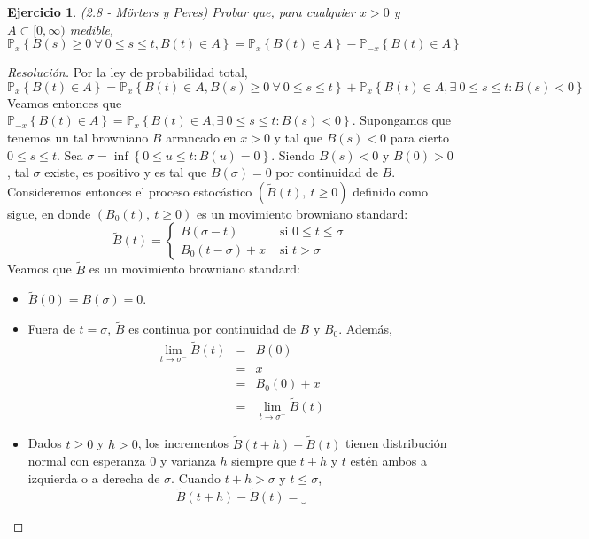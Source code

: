\documentclass[a4paper,11pt]{article}
\newcommand{\Probx}[2]{\ensuremath{\mathbb{P}_{#1} \left\{ #2 \right\}}}
\newtheorem*{ej}{Ejercicio}
\begin{document}

\begin{ej}
(2.8 - Mörters y Peres) Probar que, para cualquier $x > 0$ y $A \subset [0,\infty)$ medible,
$$\Probx{x}{B(s) \geq 0 ~\forall~ 0 \leq s \leq t, B(t) \in A} = \Probx{x}{B(t) \in A} - \Probx{-x}{B(t) \in A}$$
\end{ej}

\begin{proof}[Resoluci\'on]
Por la ley de probabilidad total,
$$\Probx{x}{B(t) \in A} = \Probx{x}{B(t) \in A, B(s) \geq 0 ~\forall~ 0 \leq s \leq t} + 
    \Probx{x}{B(t) \in A, \exists~0 \leq s \leq t : B(s) < 0}$$
Veamos entonces que $\Probx{-x}{B(t) \in A} = \Probx{x}{B(t) \in A, \exists~0 \leq s \leq t : B(s) < 0}$. Supongamos
que tenemos un tal browniano $B$ arrancado en $x > 0$ y tal que $B(s) < 0$ para cierto $0 \leq s \leq t$.
Sea $\sigma = \inf \left\{ 0 \leq u \leq t : B(u) = 0 \right\}$. Siendo $B(s) < 0$ y $B(0) > 0$, tal $\sigma$    
existe, es positivo y es tal que $B(\sigma) = 0$ por continuidad de $B$. Consideremos entonces el proceso estocástico
$(\tilde{B}(t),~ t \geq 0)$ definido como sigue, en donde $(B_0(t),~t \geq 0)$ es un movimiento browniano standard:
$$
\tilde{B}(t) = 
\begin{cases}
B(\sigma -t) & \textrm{ si } 0 \leq t \leq \sigma \\
B_0(t - \sigma) + x & \textrm{ si } t > \sigma
\end{cases}
$$
Veamos que $\tilde{B}$ es un movimiento browniano standard:
\begin{itemize}
    \item $\tilde{B}(0) = B(\sigma) = 0$.
    \item Fuera de $t = \sigma$, $\tilde{B}$ es continua por continuidad de $B$ y $B_0$. Además,
    \begin{eqnarray*}
        \lim_{t \to \sigma^{-}}{\tilde{B}(t)} &=& B(0) \\
            &=& x \\
            &=& B_0(0) + x \\
            &=& \lim_{t \to \sigma^{+}}{\tilde{B}(t)}
    \end{eqnarray*}
    \item Dados $t \geq 0$ y $h > 0$, los incrementos $\tilde{B}(t+h) - \tilde{B}(t)$ tienen distribución
    normal con esperanza 0 y varianza $h$ siempre que $t+h$ y $t$ estén ambos a izquierda o a derecha
    de $\sigma$. Cuando $t+h > \sigma$ y $t \leq \sigma$,
    $$\tilde{B}(t+h) - \tilde{B}(t) =
            \underbrace{            
}$$
\end{itemize}
\end{proof}
\end{document}
